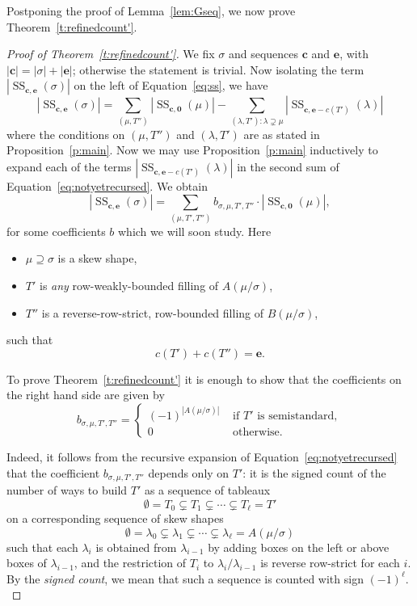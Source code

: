 \documentclass[11pt]{article}
\theoremstyle{definition}
\DeclareMathOperator{\Semi}{SS}
\newcommand{\bfc}{\mathbf{c}}
\newcommand{\bfe}{\mathbf{e}}
\begin{document}
Postponing the proof of Lemma~\ref{lem:Gseq}, we now prove Theorem~\ref{t:refinedcount'}. 

\begin{proof}[Proof of Theorem~\ref{t:refinedcount'}] 
We fix $\sigma$ and sequences $\bfc$ and $\bfe$, with $|\bfc| = |\sigma| + |\bfe|$; otherwise the statement is trivial. Now isolating the term $|\Semi_{\bfc, \bfe}(\sigma)|$ on the left of Equation~\eqref{eq:ss}, we have
\begin{equation}\label{eq:notyetrecursed}
|\Semi_{\bfc, \bfe}(\sigma)| = \sum_{(\mu,T'')} |\Semi_{\bfc, \mathbf{0}}(\mu)| - \sum_{(\lambda, T'): \lambda\supsetneq \mu } |\Semi_{\bfc, \bfe-c(T')}(\lambda)|
\end{equation}
where the conditions on $(\mu,T'')$ and $(\lambda,T')$ are as stated in Proposition~\ref{p:main}. Now we may use Proposition~\ref{p:main} inductively to expand each of the terms $|\Semi_{\bfc, \bfe-c(T')}(\lambda)|$ in the second sum of Equation~\eqref{eq:notyetrecursed}. We obtain
\begin{equation}\label{eq:nowrecursed}
|\Semi_{\bfc, \bfe}(\sigma)| = \sum_{(\mu,T',T'')} b_{\sigma,\mu,T',T''} \cdot |\Semi_{\bfc, \mathbf{0}}(\mu)|,
\end{equation}
 for some coefficients $b$ which we will soon study. Here
\begin{itemize}
\item $\mu\supseteq \sigma$ is a skew shape,
\item $T'$ is \emph{any} row-weakly-bounded filling of $A(\mu/\sigma)$, 
\item $T''$ is a reverse-row-strict, row-bounded filling of $B(\mu/\sigma)$,
\end{itemize}
such that
\[
c(T') + c(T'') = \bfe.
\]

To prove Theorem~\ref{t:refinedcount'} it is enough to show that the coefficients on the right hand side are given by
\[
b_{\sigma,\mu,T',T''} = \begin{cases}
(-1)^{|A(\mu/\sigma)|} &\text{ if $T'$ is semistandard}, \\ 
0 & \text{ otherwise.}
\end{cases}
\]

Indeed, it follows from the recursive expansion of Equation~\eqref{eq:notyetrecursed} that the coefficient $b_{\sigma,\mu,T',T''}$ depends only on $T'$: it is
the signed count of the number of ways to build $T'$ as a sequence of tableaux
\[
\emptyset = T_0 \subsetneq T_1 \subsetneq \cdots \subsetneq T_\ell = T'
\]
on a corresponding sequence of skew shapes
\[
\emptyset = \lambda_0 \subsetneq \lambda_1 \subsetneq \cdots \subsetneq \lambda_\ell = A(\mu/\sigma)\]
 such that each $\lambda_i$ is obtained from $\lambda_{i-1}$ by adding boxes on the left or above boxes of $\lambda_{i-1}$, and the restriction of $T_i$ to $\lambda_i/\lambda_{i-1}$ is reverse row-strict for each $i$. By the \emph{signed count}, we mean that such a sequence is counted with sign $(-1)^\ell.$ 


\end{proof}
\end{document}
